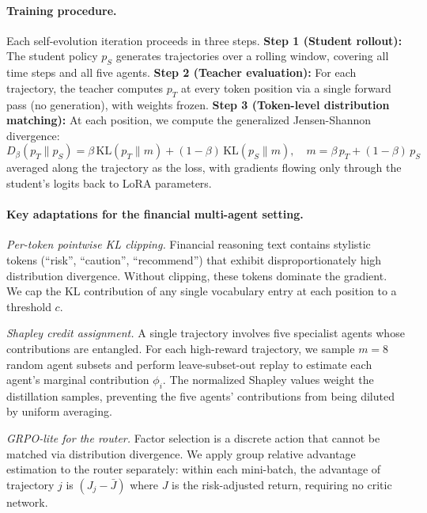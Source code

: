 \paragraph{Training procedure.} Each self-evolution iteration proceeds in three steps. \textbf{Step 1 (Student rollout):} The student policy $p_S$ generates trajectories over a rolling window, covering all time steps and all five agents. \textbf{Step 2 (Teacher evaluation):} For each trajectory, the teacher computes $p_T$ at every token position via a single forward pass (no generation), with weights frozen. \textbf{Step 3 (Token-level distribution matching):} At each position, we compute the generalized Jensen-Shannon divergence:
\begin{equation}
D_\beta(p_T \| p_S) = \beta \, \mathrm{KL}(p_T \| m) + (1-\beta) \, \mathrm{KL}(p_S \| m), \quad m = \beta \, p_T + (1-\beta) \, p_S
\end{equation}
averaged along the trajectory as the loss, with gradients flowing only through the student's logits back to LoRA parameters.

\paragraph{Key adaptations for the financial multi-agent setting.}

\emph{Per-token pointwise KL clipping.} Financial reasoning text contains stylistic tokens (``risk'', ``caution'', ``recommend'') that exhibit disproportionately high distribution divergence. Without clipping, these tokens dominate the gradient. We cap the KL contribution of any single vocabulary entry at each position to a threshold $c$.

\emph{Shapley credit assignment.} A single trajectory involves five specialist agents whose contributions are entangled. For each high-reward trajectory, we sample $m{=}8$ random agent subsets and perform leave-subset-out replay to estimate each agent's marginal contribution $\phi_i$. The normalized Shapley values weight the distillation samples, preventing the five agents' contributions from being diluted by uniform averaging.

\emph{GRPO-lite for the router.} Factor selection is a discrete action that cannot be matched via distribution divergence. We apply group relative advantage estimation to the router separately: within each mini-batch, the advantage of trajectory $j$ is $(J_j - \bar{J})$ where $J$ is the risk-adjusted return, requiring no critic network.

